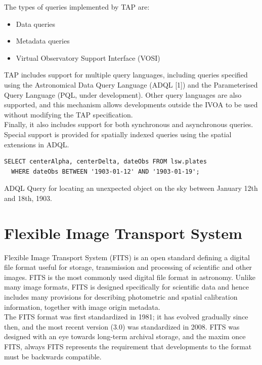 The types of queries implemented by TAP are:

\begin{itemize}
\item Data queries
\item Metadata queries
\item Virtual Observatory Support Interface (VOSI)
\end{itemize}


TAP includes support for multiple query languages, including queries specified using the Astronomical Data Query Language (ADQL [1]) and the Parameterised Query Language (PQL, under development). Other query languages are also supported, and this mechanism allows developments outside the IVOA to be used without modifying the TAP specification.\\

Finally, it also includes support for both synchronous and asynchronous queries. Special support is provided for spatially indexed queries using the spatial extensions in ADQL.\\


\begin{lstlisting}
SELECT centerAlpha, centerDelta, dateObs FROM lsw.plates
  WHERE dateObs BETWEEN '1903-01-12' AND '1903-01-19'; 
\end{lstlisting}
ADQL Query for locating an unexpected object on the sky between January 12th and 18th, 1903.


\section{Flexible Image Transport System}
 
Flexible Image Transport System (FITS) is an open standard defining a digital file format useful for storage, transmission and processing of scientific and other images. FITS is the most commonly used digital file format in astronomy. Unlike many image formats, FITS is designed specifically for scientific data and hence includes many provisions for describing photometric and spatial calibration information, together with image origin metadata.\\

The FITS format was first standardized in 1981; it has evolved gradually since then, and the most recent version (3.0) was standardized in 2008. FITS was designed with an eye towards long-term archival storage, and the maxim once FITS, always FITS represents the requirement that developments to the format must be backwards compatible.\\
 
